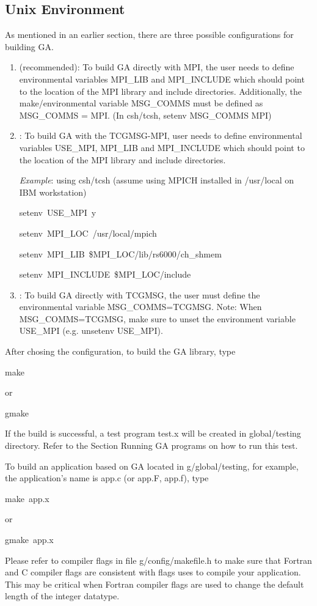 \subsection{Unix Environment }

As mentioned in an earlier section, there are three possible configurations
for building GA.
\begin{enumerate}
\item \textcolor{black}{} (recommended): To build
GA directly with MPI, the user needs to define environmental variables
MPI\_LIB and MPI\_INCLUDE which should point to the location of the
MPI library and include directories. Additionally, the make/environmental
variable MSG\_COMMS must be defined as MSG\_COMMS = MPI. (In csh/tcsh,
setenv MSG\_COMMS MPI)
\item \textcolor{black}{}: To build GA with
the TCGMSG-MPI, user needs to define environmental variables USE\_MPI,
MPI\_LIB and MPI\_INCLUDE which should point to the location of the
MPI library and include directories.


\emph{Example}: using csh/tcsh (assume using MPICH installed in /usr/local
on IBM workstation)
\begin{lyxcode}
setenv~USE\_MPI~y~

setenv~MPI\_LOC~/usr/local/mpich~

setenv~MPI\_LIB~\$MPI\_LOC/lib/rs6000/ch\_shmem~

setenv~MPI\_INCLUDE~\$MPI\_LOC/include
\end{lyxcode}
\item \textcolor{black}{}: To build GA directly
with TCGMSG, the user must define the environmental variable MSG\_COMMS=TCGMSG.
Note: When MSG\_COMMS=TCGMSG, make sure to unset the environment variable
USE\_MPI (e.g. unsetenv USE\_MPI).
\end{enumerate}
After chosing the configuration, to build the GA library, type 
\begin{lyxcode}
make~
\end{lyxcode}
or 
\begin{lyxcode}
gmake
\end{lyxcode}
If the build is successful, a test program test.x will be created
in global/testing directory. Refer to the Section \textquotedbl{}Running
GA programs\textquotedbl{} on how to run this test.

To build an application based on GA located in g/global/testing, for
example, the application's name is app.c (or app.F, app.f), type 
\begin{lyxcode}
make~app.x~
\end{lyxcode}
or 
\begin{lyxcode}
gmake~app.x
\end{lyxcode}
Please refer to compiler flags in file g/config/makefile.h to make
sure that Fortran and C compiler flags are consistent with flags uses
to compile your application. This may be critical when Fortran compiler
flags are used to change the default length of the integer datatype.


